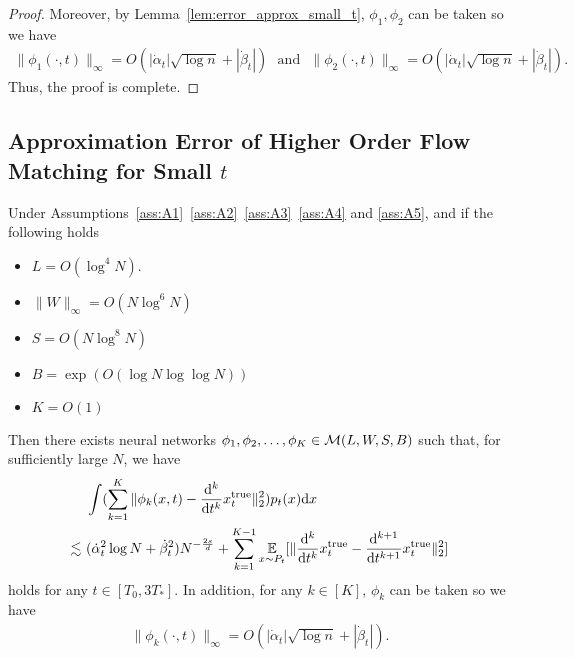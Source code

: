 \begin{proof}
    Moreover, by Lemma~\ref{lem:error_approx_small_t}, $\phi_1, \phi_2$ can be taken so we have
    \begin{align*}
         \|\phi_1(\cdot,t) \|_\infty = O(  |\dot{\alpha}_t | \sqrt{\log n} +  |\dot{\beta}_t |) \mathrm{~~~and~~~} \|\phi_2(\cdot,t) \|_\infty = O(  |\dot{\alpha}_t | \sqrt{\log n} +  |\dot{\beta}_t |).
    \end{align*}
    Thus, the proof is complete.
\end{proof}

\subsection{Approximation Error of Higher Order Flow Matching for Small \texorpdfstring{$t$}{}}
\begin{theorem}\label{thm:higher_order_small_t:formal}
    Under Assumptions~\ref{ass:A1}~\ref{ass:A2}~\ref{ass:A3}~\ref{ass:A4} and \ref{ass:A5}, and if the following holds 
    \begin{itemize}
        \item $L = O(\log^4 N )$.
        \item $\|W\|_{\infty} = O(N \log^{6} N)$
        \item $S = O(N \log^{8} N)$
        \item $B = \exp(O (\log N \log \log N ) )$
        \item $K = O(1)$
    \end{itemize}
    Then there exists neural networks $\phi_{1},\phi_2, \ldots, \phi_K \in {\cal M}(L,W,S,B)$ such that, for sufficiently large $N$, we have
\begin{align*}
    &~ \int (\sum_{k=1}^K\|\phi_k(x, t) - \frac{\mathrm{d}^k}{\mathrm{d} t^k}x_t^\mathrm{true}\|_2^2) p_t(x) \mathrm{d} x \\ \lesssim &~ (\dot{\alpha}_t^2 \log N + \dot{\beta}_t^2 ) N^{- \frac{2s}{d}} +
    \sum_{k=1}^{K-1}\operatorname*{{\mathbb{E}}}_{x \sim P_t}[\|\frac{\mathrm{d}^k}{\mathrm{d} t^k}x_t^\mathrm{true} - \frac{\mathrm{d}^{k+1}}{\mathrm{d} t^{k+1}}x_t^\mathrm{true}\|_2^2] 
\end{align*}
    holds for any $t \in [T_{0}, 3T_{*}]$. In addition, for any $k \in [K]$, $\phi_k$ can be taken so we have
    \begin{align*}
         \|\phi_k(\cdot,t) \|_\infty = O(  |\dot{\alpha}_t | \sqrt{\log n} +  |\dot{\beta}_t |).
    \end{align*}
\end{theorem}
